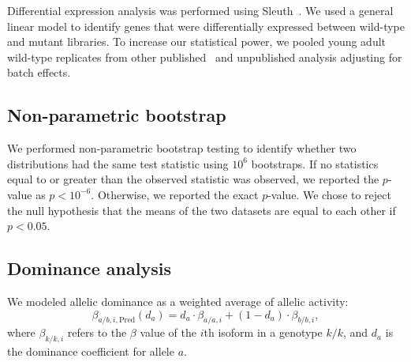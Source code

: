 \documentclass[10pt, twocolumn]{article}
\begin{document}
Differential expression analysis was performed using
Sleuth~\cite{Pimentel2016a}. We used a general linear model to identify
genes that were differentially expressed between wild-type and mutant libraries.
To increase our statistical power, we pooled young adult wild-type replicates
from other published~\cite{AngelesAlboresHIF,Angeles-Albores2017} and unpublished
analysis adjusting for batch effects.

\subsection*{Non-parametric bootstrap}
We performed non-parametric bootstrap testing to identify whether two
distributions had the same test statistic using $10^6$ bootstraps.
If no statistics equal to or greater than the observed statistic was observed,
we reported the $p$-value as $p<10^{-6}$. Otherwise, we reported
the exact $p$-value. We chose to reject the null hypothesis that the means of
the two datasets are equal to each other if $p < 0.05$.

\subsection*{Dominance analysis}
\label{subsec:dominance}
We modeled allelic dominance as a weighted average of allelic activity:
\begin{equation}
  \beta_{a/b,i,\text{Pred}}(d_a) = d_a\cdot \beta_{a/a,i} +
                                   (1-d_a)\cdot \beta_{b/b,i},
\end{equation}
where $\beta_{k/k, i}$ refers to the $\beta$ value of the $i$th isoform in a
genotype $k/k$, and $d_a$ is the dominance coefficient for allele $a$.
\end{document}
